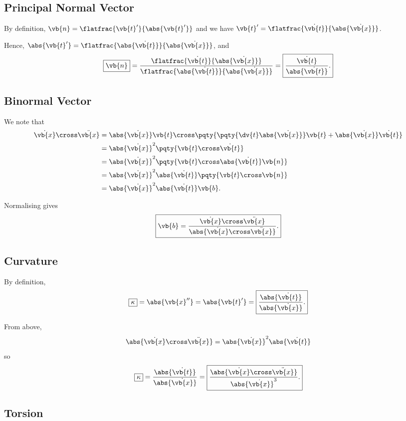 \documentclass{article}
\begin{document}
\subsection*{Principal Normal Vector}

By definition, \(\vb{n} = \flatfrac{\vb{t}'}{\abs{\vb{t}'}}\) and we have \(\vb{t}' = \flatfrac{\dot{\vb{t}}}{\abs{\dot{\vb{x}}}}\).

Hence, \(\abs{\vb{t}'} = \flatfrac{\abs{\dot{\vb{t}}}}{\abs{\dot{\vb{x}}}}\), and
\[
    \boxed{\vb{n}} = \frac{\flatfrac{\dot{\vb{t}}}{\abs{\dot{\vb{x}}}}}{\flatfrac{\abs{\dot{\vb{t}}}}{\abs{\dot{\vb{x}}}}} = \boxed{\frac{\dot{\vb{t}}}{\abs{\dot{\vb{t}}}}.}
\]

\subsection*{Binormal Vector}

We note that
\begin{align*}
    \dot{\vb{x}} \cross \ddot{\vb{x}} &= \abs{\dot{\vb{x}}} \vb{t} \cross \pqty{\pqty{\dv{t} \abs{\dot{\vb{x}}}} \vb{t} + \abs{\dot{\vb{x}}} \dot{\vb{t}}} \\
    &= \abs{\dot{\vb{x}}}^2 \pqty{\vb{t} \cross \dot{\vb{t}}} \\
    &= \abs{\dot{\vb{x}}}^2 \pqty{\vb{t} \cross \abs{\dot{\vb{t}}} \vb{n}} \\
    &= \abs{\dot{\vb{x}}}^2 \abs{\dot{\vb{t}}} \pqty{\vb{t} \cross \vb{n}} \\
    &= \abs{\dot{\vb{x}}}^2 \abs{\dot{\vb{t}}} \vb{b}.
\end{align*}

Normalising gives
\[
    \boxed{\vb{b} = \frac{\dot{\vb{x}} \cross \ddot{\vb{x}}}{\abs{\dot{\vb{x}} \cross \ddot{\vb{x}}}}.}
\]

\subsection*{Curvature}

By definition,
\[
    \boxed{\kappa} = \abs{\vb{x}''} = \abs{\vb{t}'} = \boxed{\frac{\abs{\dot{\vb{t}}}}{\abs{\dot{\vb{x}}}}.}
\]

From above,
\[
    \abs{\dot{\vb{x}} \cross \ddot{\vb{x}}} = \abs{\dot{\vb{x}}}^2 \abs{\dot{\vb{t}}}
\]
so
\[
    \boxed{\kappa} = \frac{\abs{\dot{\vb{t}}}}{\abs{\dot{\vb{x}}}} = \boxed{\frac{\abs{\dot{\vb{x}} \cross \ddot{\vb{x}}}}{\abs{\dot{\vb{x}}}^3}.}
\]

\subsection*{Torsion}
\end{document}
